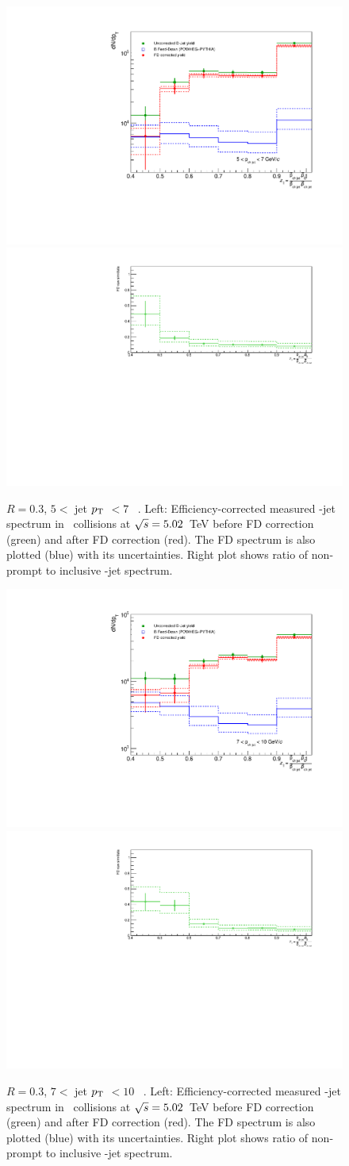 \begin{figure}[bth]
\centering
\includegraphics[width=.47\textwidth]{pp_2sig/FD/R3/5_7/JetPtSpectra_FDsub}
\includegraphics[width=.522\textwidth]{pp_2sig/FD/R3/5_7/FDratio}
\caption{$R=0.3$, $5<$ jet $p_{\text T}$ $< 7$ \GeVc\ . Left: Efficiency-corrected measured \Dzero-jet spectrum in \pp\ collisions at $\sqrt{s}=5.02$~TeV before FD correction (green) and after FD correction (red). The FD spectrum is also plotted (blue) with its uncertainties. Right plot shows ratio of non-prompt to inclusive \Dzero-jet spectrum.}
\label{fig:ppFD_corr_Dzero_z5_7_R3}
\end{figure}

\begin{figure}[bth]
\centering
\includegraphics[width=.47\textwidth]{pp_2sig/FD/R3/7_10/JetPtSpectra_FDsub}
\includegraphics[width=.522\textwidth]{pp_2sig/FD/R3/7_10/FDratio}
\caption{$R=0.3$, $7<$ jet $p_{\text T}$ $<10$ \GeVc\ . Left: Efficiency-corrected measured \Dzero-jet spectrum in \pp\ collisions at $\sqrt{s}=5.02$~TeV before FD correction (green) and after FD correction (red). The FD spectrum is also plotted (blue) with its uncertainties. Right plot shows ratio of non-prompt to inclusive \Dzero-jet spectrum.}
\label{fig:ppFD_corr_Dzero_z7_10_R3}
\end{figure}

